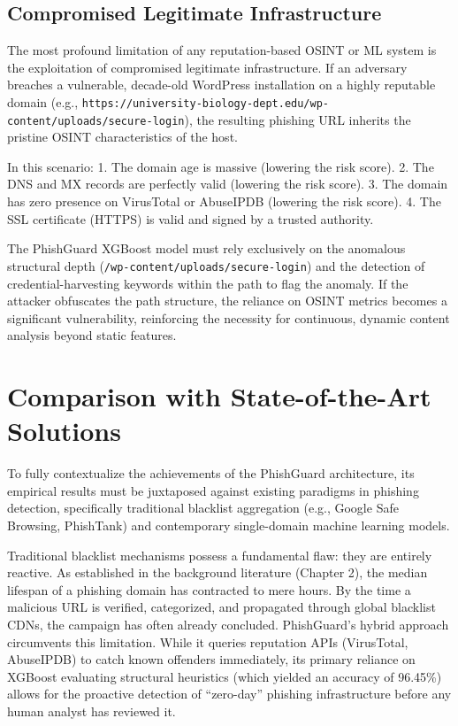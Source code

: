 \subsection{Compromised Legitimate
Infrastructure}\label{compromised-legitimate-infrastructure}

The most profound limitation of any reputation-based OSINT or ML system
is the exploitation of compromised legitimate infrastructure. If an
adversary breaches a vulnerable, decade-old WordPress installation on a
highly reputable domain (e.g.,
\texttt{https://university-biology-dept.edu/wp-content/uploads/secure-login}),
the resulting phishing URL inherits the pristine OSINT characteristics
of the host.

In this scenario: 1. The domain age is massive (lowering the risk
score). 2. The DNS and MX records are perfectly valid (lowering the risk
score). 3. The domain has zero presence on VirusTotal or AbuseIPDB
(lowering the risk score). 4. The SSL certificate (HTTPS) is valid and
signed by a trusted authority.

The PhishGuard XGBoost model must rely exclusively on the anomalous
structural depth (\texttt{/wp-content/uploads/secure-login}) and the
detection of credential-harvesting keywords within the path to flag the
anomaly. If the attacker obfuscates the path structure, the reliance on
OSINT metrics becomes a significant vulnerability, reinforcing the
necessity for continuous, dynamic content analysis beyond static
features.

\section{Comparison with State-of-the-Art
Solutions}\label{comparison-with-state-of-the-art-solutions}

To fully contextualize the achievements of the PhishGuard architecture,
its empirical results must be juxtaposed against existing paradigms in
phishing detection, specifically traditional blacklist aggregation
(e.g., Google Safe Browsing, PhishTank) and contemporary single-domain
machine learning models.

Traditional blacklist mechanisms possess a fundamental flaw: they are
entirely reactive. As established in the background literature (Chapter
2), the median lifespan of a phishing domain has contracted to mere
hours. By the time a malicious URL is verified, categorized, and
propagated through global blacklist CDNs, the campaign has often already
concluded. PhishGuard's hybrid approach circumvents this limitation.
While it queries reputation APIs (VirusTotal, AbuseIPDB) to catch known
offenders immediately, its primary reliance on XGBoost evaluating
structural heuristics (which yielded an accuracy of 96.45\%) allows for
the proactive detection of ``zero-day'' phishing infrastructure before
any human analyst has reviewed it.

